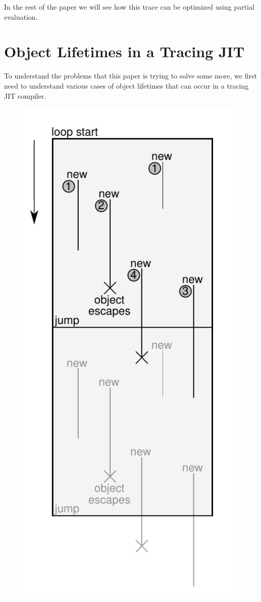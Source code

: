 \documentclass[preprint]{sigplanconf}
\begin{document}
In the rest of the paper we will see how this trace can be optimized using
partial evaluation.

\section{Object Lifetimes in a Tracing JIT}
\label{sec:lifetimes}


To understand the problems that this paper is trying to solve some more, we
first need to understand various cases of object lifetimes that can occur in a
tracing JIT compiler.

\begin{figure}
\begin{center}
\includegraphics[scale=0.6]{figures/obj-lifetime.pdf}
\end{center}


\end{figure}
\end{document}
